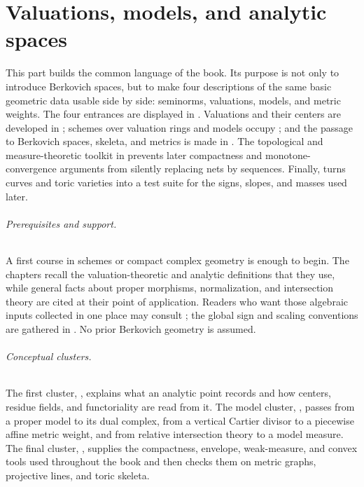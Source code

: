 \part{Valuations, models, and analytic spaces}
\label{part:foundations}

This part builds the common language of the book.  Its purpose is not only to
introduce Berkovich spaces, but to make four descriptions of the same basic
geometric data usable side by side: seminorms, valuations, models, and metric
weights.  The four entrances are displayed in .
Valuations and their centers are developed in ; schemes
over valuation rings and models occupy ; and the passage to
Berkovich spaces, skeleta, and metrics is made in
.  The topological and
measure-theoretic toolkit in  prevents later
compactness and monotone-convergence arguments from silently replacing nets
by sequences.  Finally,  turns curves and toric
varieties into a test suite for the signs, slopes, and masses used later.

\paragraph{Prerequisites and support.}
\label{front:part1-prerequisites-and-support}
A first course in schemes or compact complex geometry is enough to begin.
The chapters recall the valuation-theoretic and analytic definitions that
they use, while general facts about proper morphisms, normalization, and
intersection theory are cited at their point of application.  Readers who
want those algebraic inputs collected in one place may consult
; the global
sign and scaling conventions are gathered in .
No prior Berkovich geometry is assumed.

\paragraph{Conceptual clusters.}
\label{front:part1-conceptual-clusters}
The first cluster,
, explains what an
analytic point records and how centers, residue fields, and functoriality are
read from it.  The model cluster,
, passes from a proper model to its
dual complex, from a vertical Cartier divisor to a piecewise affine metric
weight, and from relative intersection theory to a model measure.  The final
cluster, , supplies the
compactness, envelope, weak-measure, and convex tools used throughout the
book and then checks them on metric graphs, projective lines, and toric
skeleta.


